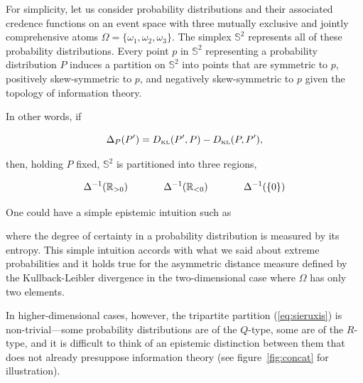 \documentclass[smallextended]{svjour3}       %
\begin{document}
For simplicity, let us consider probability distributions and their
associated credence functions on an event space with three mutually
exclusive and jointly comprehensive atoms
$\Omega=\{\omega_{1},\omega_{2},\omega_{3}\}$. The simplex
$\mathbb{S}^{2}$ represents all of these probability distributions.
Every point $p$ in $\mathbb{S}^{2}$ representing a probability
distribution $P$ induces a partition on $\mathbb{S}^{2}$ into points
that are symmetric to $p$, positively skew-symmetric to $p$, and
negatively skew-symmetric to $p$ given the topology of information
theory.

In other words, if

\begin{equation}
  \label{eq:sksy}
  \Delta_{P}(P')=D_{\mbox{\tiny KL}}(P',P)-D_{\mbox{\tiny KL}}(P,P'),
\end{equation}

then, holding $P$ fixed, $\mathbb{S}^{2}$ is partitioned into three
regions, 

\begin{equation}
  \label{eq:sieruxis}
  \Delta^{-1}(\mathbb{R}_{>0})\hspace{.5in}\Delta^{-1}(\mathbb{R}_{<0})\hspace{.5in}\Delta^{-1}(\{0\})
\end{equation}

One could have a simple epistemic intuition such as 

where the degree of certainty in a probability distribution is
measured by its entropy. This simple intuition accords with what we
said about extreme probabilities and it holds true for the asymmetric
distance measure defined by the Kullback-Leibler divergence in the
two-dimensional case where $\Omega$ has only two elements.

In higher-dimensional cases, however, the tripartite partition
(\ref{eq:sieruxis}) is non-trivial---some probability distributions
are of the $Q$-type, some are of the $R$-type, and it is difficult to
think of an epistemic distinction between them that does not already
presuppose information theory (see figure~\ref{fig:concat} for
illustration).
\end{document}
